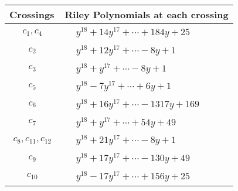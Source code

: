 \documentclass[1p]{elsarticle_modified}
\theoremstyle{definition}
\begin{document}
\begin{tabular}{m{50pt}|m{274pt}}
Crossings & \hspace{64pt}Riley Polynomials at each crossing \\
\hline $$\begin{aligned}c_{1},c_{4}\end{aligned}$$&$\begin{aligned}
&y^{18}+14 y^{17}+\cdots+184 y+25
\end{aligned}$\\
\hline $$\begin{aligned}c_{2}\end{aligned}$$&$\begin{aligned}
&y^{18}+12 y^{17}+\cdots-8 y+1
\end{aligned}$\\
\hline $$\begin{aligned}c_{3}\end{aligned}$$&$\begin{aligned}
&y^{18}+y^{17}+\cdots-8 y+1
\end{aligned}$\\
\hline $$\begin{aligned}c_{5}\end{aligned}$$&$\begin{aligned}
&y^{18}-7 y^{17}+\cdots+6 y+1
\end{aligned}$\\
\hline $$\begin{aligned}c_{6}\end{aligned}$$&$\begin{aligned}
&y^{18}+16 y^{17}+\cdots-1317 y+169
\end{aligned}$\\
\hline $$\begin{aligned}c_{7}\end{aligned}$$&$\begin{aligned}
&y^{18}+y^{17}+\cdots+54 y+49
\end{aligned}$\\
\hline $$\begin{aligned}c_{8},c_{11},c_{12}\end{aligned}$$&$\begin{aligned}
&y^{18}+21 y^{17}+\cdots-8 y+1
\end{aligned}$\\
\hline $$\begin{aligned}c_{9}\end{aligned}$$&$\begin{aligned}
&y^{18}+17 y^{17}+\cdots-130 y+49
\end{aligned}$\\
\hline $$\begin{aligned}c_{10}\end{aligned}$$&$\begin{aligned}
&y^{18}-17 y^{17}+\cdots+156 y+25
\end{aligned}$\\
\hline
\end{tabular}\\~\\
\end{document}
